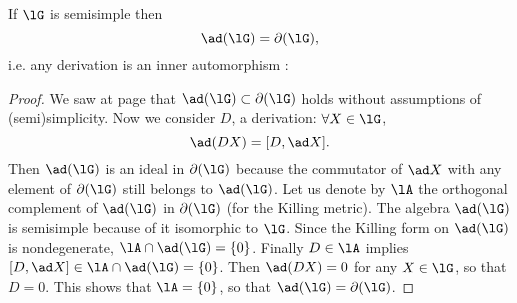 \begin{proposition}
If $\lG$ is semisimple then 
\[
   \ad(\lG)=\partial(\lG),
\]
i.e. any derivation is an inner automorphism :
\label{prop:ss_derr_int}
\end{proposition}

\begin{proof}
We saw at page \pageref{pg:ad_subset_der} that $\ad(\lG)\subset\partial(\lG)$ holds without assumptions of (semi)simplicity. Now we consider $D$, a derivation: $\forall X\in\lG$,
\[
   \ad(DX)=[D,\ad X].
\]
Then $\ad(\lG)$ is an ideal in $\partial(\lG)$ because the commutator of $\ad X$ with any element of $\partial(\lG)$ still belongs to $\ad(\lG)$. Let us denote by $\lA$ the orthogonal complement of $\ad(\lG)$ in $\partial(\lG)$ (for the Killing metric). The algebra $\ad(\lG)$ is semisimple because of it isomorphic to $\lG$. Since the Killing form on $\ad(\lG)$ is nondegenerate, $\lA\cap\ad(\lG)=\{0\}$. Finally $D\in\lA$ implies $[D,\ad X]\in\lA\cap\ad(\lG)=\{0\}$. Then $\ad(DX)=0$ for any $X\in\lG$, so that $D=0$. This shows that $\lA=\{0\}$, so that $\ad(\lG)=\partial(\lG)$.
\end{proof}
